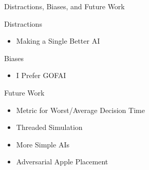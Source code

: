 \documentclass[presentation,bigger]{beamer}
\begin{document}
\begin{frame}[label={sec:org827db76}]{Distractions, Biases, and Future Work}
\begin{block}{Distractions}
\begin{itemize}
\item Making a Single Better AI
\end{itemize}
\end{block}
\begin{block}{Biases}
\begin{itemize}
\item I Prefer GOFAI
\end{itemize}
\end{block}
\begin{block}{Future Work}
\begin{itemize}
\item Metric for Worst/Average Decision Time
\item Threaded Simulation
\item More Simple AIs
\item Adversarial Apple Placement
\end{itemize}
\end{block}
\end{frame}
\end{document}
